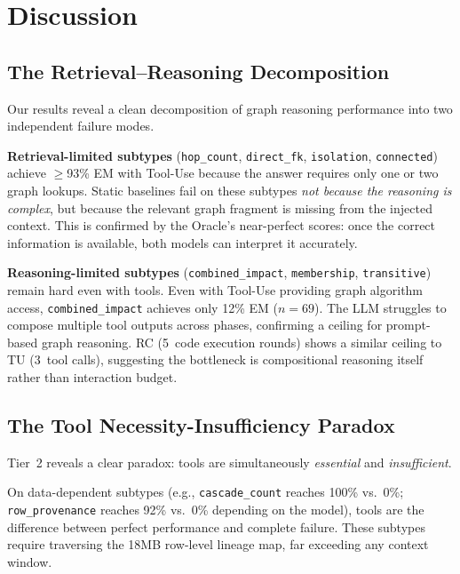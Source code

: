 \section{Discussion}
\label{sec:discussion}

\subsection{The Retrieval--Reasoning Decomposition}

Our results reveal a clean decomposition of graph reasoning performance
into two independent failure modes.

\textbf{Retrieval-limited subtypes} (\texttt{hop\_count},
\texttt{direct\_fk}, \texttt{isolation}, \texttt{connected}) achieve
$\geq$93\% EM with Tool-Use because the answer requires only one or
two graph lookups.  Static baselines fail on these subtypes
\emph{not because the reasoning is complex}, but because the relevant
graph fragment is missing from the injected context.  This is confirmed
by the Oracle's near-perfect scores: once the correct information is
available, both models can interpret it accurately.

\textbf{Reasoning-limited subtypes} (\texttt{combined\_impact},
\texttt{membership}, \texttt{transitive}) remain hard even with tools.
Even with Tool-Use providing graph algorithm access,
\texttt{combined\_impact} achieves only 12\% EM ($n=69$).  The LLM
struggles to compose multiple tool outputs across phases, confirming
a ceiling for prompt-based graph reasoning.  RC
(5~code execution rounds) shows a similar ceiling to TU (3~tool calls),
suggesting the bottleneck is compositional reasoning itself rather
than interaction budget.

\subsection{The Tool Necessity-Insufficiency Paradox}

Tier~2 reveals a clear paradox: tools are simultaneously
\emph{essential} and \emph{insufficient}.

On data-dependent subtypes (e.g., \texttt{cascade\_count} reaches 100\% vs.\ 0\%;
\texttt{row\_provenance} reaches 92\% vs.\ 0\% depending on the model), tools are the difference
between perfect performance and complete failure.  These subtypes
require traversing the 18MB row-level lineage map, far exceeding any
context window.

